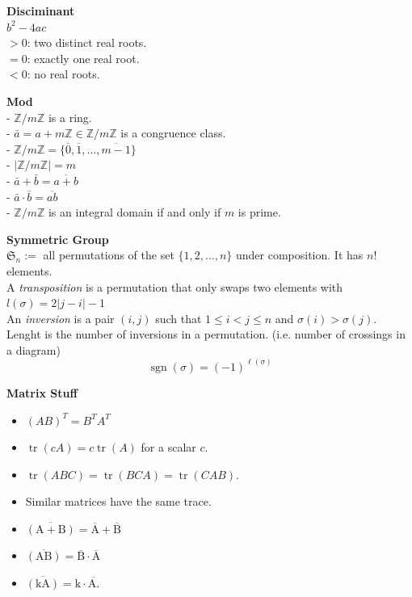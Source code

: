 \documentclass[a4paper, 10pt]{article}
\begin{document}
\begin{multicols*}{3}
\textbf{Disciminant}\\
$b^2 - 4ac$\\
$> 0$: two distinct real roots.\\
$= 0$: exactly one real root.\\
$< 0$: no real roots. 

\textbf{Mod}\\
- $\mathbb{Z} / m \mathbb{Z}$ is a ring. \\
- $\bar{a}=a+m \mathbb{Z}\in\mathbb{Z} / m \mathbb{Z}$ is a congruence class.\\
- $\mathbb{Z} / m \mathbb{Z}=\{\overline{0}, \overline{1}, \ldots, \overline{m-1}\}$\\
- $|\mathbb{Z} / m \mathbb{Z}|=m$\\
- $\bar{a}+\bar{b}=\overline{a+b}$\\
- $\bar{a} \cdot \bar{b}=\overline{a b}$\\
- $\mathbb{Z} / m \mathbb{Z}$ is an integral domain if and only if $m$ is prime.

\textbf{Symmetric Group}\\
$\mathfrak{S}_n := $ all permutations of the set $\{1,2, \ldots, n\}$ under composition.
It has $n !$ elements.\\
A \textit{transposition} is a permutation that only swaps two elements with $l(\sigma) = 2|j-i|-1$\\
An \textit{inversion} is a pair $(i, j)$ such that $1 \leqslant i<j \leqslant n$ and $\sigma(i)>\sigma(j)$.\\
Lenght is the number of inversions in a permutation. (i.e. number of crossings in a diagram)
$$
\operatorname{sgn}(\sigma)=(-1)^{\ell(\sigma)}
$$

\textbf{Matrix Stuff}
\begin{itemize}[label=\textbullet, labelsep=0.3em, leftmargin=1em]
\item $(A B)^T=B^T A^T$
\item $\operatorname{tr}(c A)=c \operatorname{tr}(A)$ for a scalar $c$.
\item $\operatorname{tr}(A B C)=\operatorname{tr}(B C A)=\operatorname{tr}(C A B)$.
\item Similar matrices have the same trace. 
\item $\overline{(\mathrm{A}+\mathrm{B})}=\overline{\mathrm{A}}+\overline{\mathrm{B}}$
\item $\overline{(\mathrm{AB})}=\overline{\mathrm{B}} \cdot \overline{\mathrm{A}}$
\item $\overline{(\mathrm{kA})}=\mathrm{k} \cdot \overline{\mathrm{A} .}$
\end{itemize}


\end{multicols*}
\end{document}
